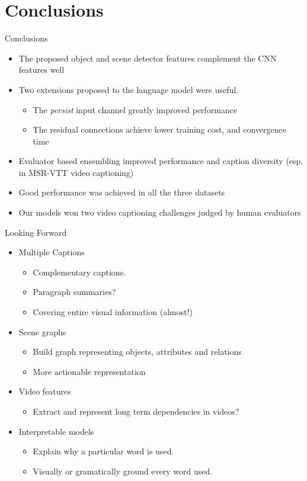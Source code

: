\documentclass{beamer}
\begin{document}
\section{Conclusions}
\begin{frame}{Conclusions}
\begin{itemize}
    \item The proposed object and scene detector features complement the CNN features well 
    \item Two extensions proposed to the language model were useful. 
       \begin{itemize}
           \item The \emph{persist} input channel greatly improved performance
           \item The residual connections achieve lower training cost, and convergence time
       \end{itemize}
    \item Evaluator based ensembling improved performance and caption diversity (esp. in MSR-VTT video captioning)
    \item Good performance was achieved in all the three datasets
    \item Our models won two video captioning challenges judged by human evaluators 
\end{itemize}
\end{frame}
\begin{frame}{Looking Forward}
\begin{itemize}
    \item Multiple Captions
       \begin{itemize}
           \item Complementary captions.
           \item Paragraph summaries?
           \item Covering entire visual information (almost!)
       \end{itemize}
    \item Scene graphs 
       \begin{itemize}
           \item Build graph representing objects, attributes and relations 
           \item More actionable representation
       \end{itemize}
    \item Video features 
       \begin{itemize}
           \item Extract and represent long term dependencies in videos? 
       \end{itemize}
    \item Interpretable models
       \begin{itemize}
           \item Explain why a particular word is used.
           \item Visually or gramatically ground every word used.
       \end{itemize}

\end{itemize}
\end{frame}
\end{document}
